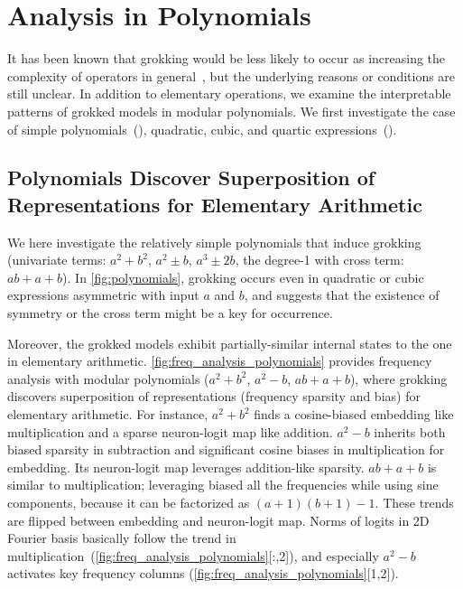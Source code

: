 \documentclass[10pt]{article} %
\begin{document}
\vskip -0.25in
\section{Analysis in Polynomials}
\label{sec:poly}
It has been known that grokking would be less likely to occur as increasing the complexity of operators in general~\citep{power2022grokking}, but the underlying reasons or conditions are still unclear.
In addition to elementary operations, we examine the interpretable patterns of grokked models in modular polynomials.
We first investigate the case of simple polynomials~(), quadratic, cubic, and quartic expressions~().


\subsection{Polynomials Discover Superposition of Representations for Elementary Arithmetic}
\label{sec:poly_without_cross}
We here investigate the relatively simple polynomials that induce grokking (univariate terms: $a^2+b^2$, $a^2\pm b$, $a^3 \pm 2b$, the degree-1 with cross term: $ab+a+b$).
In \autoref{fig:polynomials}, grokking occurs even in quadratic or cubic expressions asymmetric with input $a$ and $b$, and suggests that the existence of symmetry or the cross term might be a key for occurrence.

Moreover, the grokked models exhibit partially-similar internal states to the one in elementary arithmetic.
\autoref{fig:freq_analysis_polynomials} provides frequency analysis with modular polynomials ($a^2+b^2$, $a^2-b$, $ab+a+b$), where grokking discovers superposition of representations (frequency sparsity and bias) for elementary arithmetic.
For instance, $a^2+b^2$ finds a cosine-biased embedding like multiplication and a sparse neuron-logit map like addition.
$a^2-b$ inherits both biased sparsity in subtraction and significant cosine biases in multiplication for embedding. Its neuron-logit map leverages addition-like sparsity.
$ab+a+b$ is similar to multiplication; leveraging biased all the frequencies while using sine components, because it can be factorized as $(a+1)(b+1) - 1$.
These trends are flipped between embedding and neuron-logit map.
Norms of logits in 2D Fourier basis basically follow the trend in multiplication~(\autoref{fig:freq_analysis_polynomials}[:,2]), and especially $a^2-b$ activates key frequency columns (\autoref{fig:freq_analysis_polynomials}[1,2]).
\end{document}
